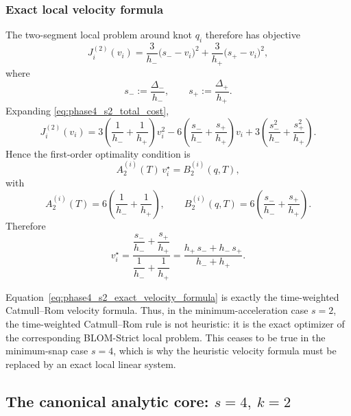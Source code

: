 \subsubsection{Exact local velocity formula}
\label{subsubsec:phase4_s2_exact_velocity}

The two-segment local problem around knot \(q_i\) therefore has objective
\begin{equation}
\label{eq:phase4_s2_total_cost}
J_i^{(2)}(v_i)
=
\frac{3}{h_-}\bigl(s_- - v_i\bigr)^2
+
\frac{3}{h_+}\bigl(s_+ - v_i\bigr)^2,
\end{equation}
where
\[
s_-:=\frac{\Delta_-}{h_-},
\qquad
s_+:=\frac{\Delta_+}{h_+}.
\]
Expanding \eqref{eq:phase4_s2_total_cost},
\[
J_i^{(2)}(v_i)
=
3\left(\frac{1}{h_-}+\frac{1}{h_+}\right)v_i^2
-
6\left(\frac{s_-}{h_-}+\frac{s_+}{h_+}\right)v_i
+
3\left(\frac{s_-^2}{h_-}+\frac{s_+^2}{h_+}\right).
\]
Hence the first-order optimality condition is
\begin{equation}
\label{eq:phase4_s2_linear_system_scalar}
A_2^{(i)}(T)\,v_i^\star = B_2^{(i)}(q,T),
\end{equation}
with
\begin{equation}
\label{eq:phase4_s2_A_B}
A_2^{(i)}(T)
=
6\left(\frac{1}{h_-}+\frac{1}{h_+}\right),
\qquad
B_2^{(i)}(q,T)
=
6\left(\frac{s_-}{h_-}+\frac{s_+}{h_+}\right).
\end{equation}
Therefore
\begin{equation}
\label{eq:phase4_s2_exact_velocity_formula}
v_i^\star
=
\frac{\dfrac{s_-}{h_-}+\dfrac{s_+}{h_+}}{\dfrac{1}{h_-}+\dfrac{1}{h_+}}
=
\frac{h_+\,s_-+h_-\,s_+}{h_-+h_+}.
\end{equation}

\begin{remark}
\label{rem:phase4_catmull_rom_exact_s2}
Equation~\eqref{eq:phase4_s2_exact_velocity_formula} is exactly the time-weighted Catmull--Rom velocity formula.
Thus, in the minimum-acceleration case \(s=2\), the time-weighted Catmull--Rom rule is not heuristic: it is the exact optimizer of the corresponding BLOM-Strict local problem.
This ceases to be true in the minimum-snap case \(s=4\), which is why the heuristic velocity formula must be replaced by an exact local linear system.
\end{remark}

\subsection{The canonical analytic core: \texorpdfstring{$s=4,\ k=2$}{s=4,k=2}}
\label{subsec:phase4_s4_k2}

